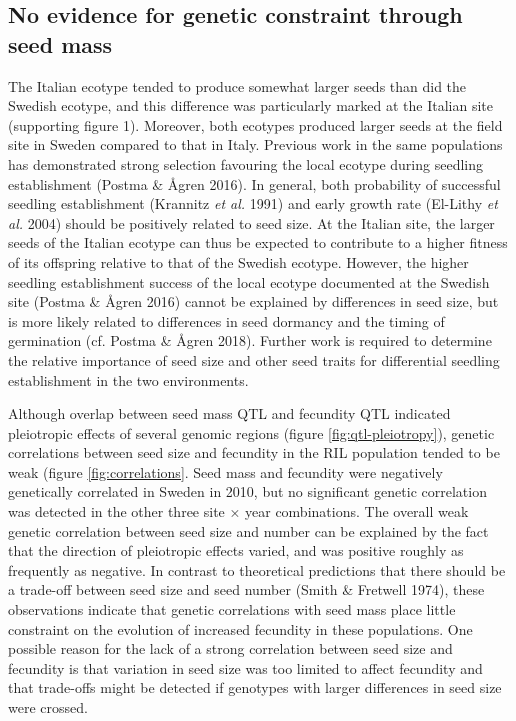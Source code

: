 \documentclass[12pt,]{article}
\begin{document}
\hypertarget{no-evidence-for-genetic-constraint-through-seed-mass}{%
\subsection{No evidence for genetic constraint through seed mass}\label{no-evidence-for-genetic-constraint-through-seed-mass}}

The Italian ecotype tended to produce somewhat larger seeds than did the Swedish ecotype, and this difference was particularly marked at the Italian site (supporting figure 1). Moreover, both ecotypes produced larger seeds at the field site in Sweden compared to that in Italy. Previous work in the same populations has demonstrated strong selection favouring the local ecotype during seedling establishment (Postma \& Ågren 2016). In general, both probability of successful seedling establishment (Krannitz \emph{et al.} 1991) and early growth rate (El-Lithy \emph{et al.} 2004) should be positively related to seed size.
At the Italian site, the larger seeds of the Italian ecotype can thus be expected to contribute to a higher fitness of its offspring relative to that of the Swedish ecotype. However, the higher seedling establishment success of the local ecotype documented at the Swedish site (Postma \& Ågren 2016) cannot be explained by differences in seed size, but is more likely related to differences in seed dormancy and the timing of germination (cf. Postma \& Ågren 2018). Further work is required to determine the relative importance of seed size and other seed traits for differential seedling establishment in the two environments.

Although overlap between seed mass QTL and fecundity QTL indicated pleiotropic effects of several genomic regions (figure \ref{fig:qtl-pleiotropy}), genetic correlations between seed size and fecundity in the RIL population tended to be weak (figure \ref{fig:correlations}. Seed mass and fecundity were negatively genetically correlated in Sweden in 2010, but no significant genetic correlation was detected in the other three site × year combinations. The overall weak genetic correlation between seed size and number can be explained by the fact that the direction of pleiotropic effects varied, and was positive roughly as frequently as negative. In contrast to theoretical predictions that there should be a trade-off between seed size and seed number (Smith \& Fretwell 1974), these observations indicate that genetic correlations with seed mass place little constraint on the evolution of increased fecundity in these populations. One possible reason for the lack of a strong correlation between seed size and fecundity is that variation in seed size was too limited to affect fecundity and that trade-offs might be detected if genotypes with larger differences in seed size were crossed.
\end{document}
